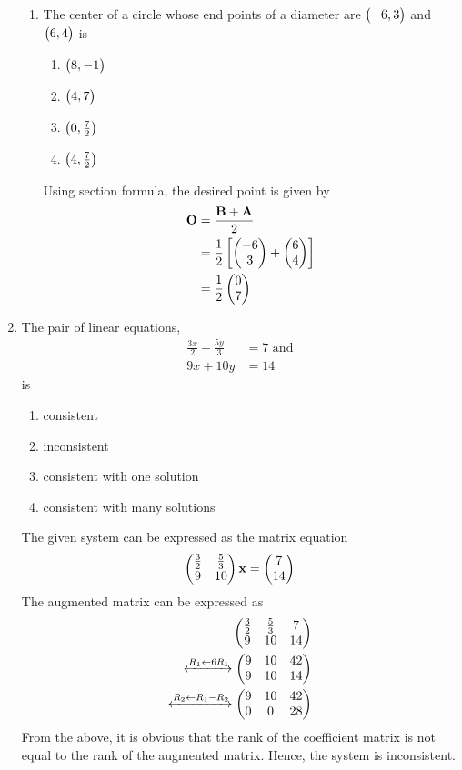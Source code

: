 \documentclass[journal,12pt,twocolumn]{IEEEtran}
\begin{document}
\begin{enumerate}
\begin{enumerate}
\item The center of a circle whose end points of a diameter are $\begin{pmatrix}-6, 3\end{pmatrix}$ and $\begin{pmatrix}6,4\end{pmatrix}$ is
\begin{enumerate}
\item $\begin{pmatrix}8,-1\end{pmatrix}$
\item $\begin{pmatrix}4,7\end{pmatrix}$
\item $\begin{pmatrix}0,\frac{7}{2}\end{pmatrix}$
\item $\begin{pmatrix}4,\frac{7}{2}\end{pmatrix}$
\end{enumerate}
		\solution 
Using section formula, 
		the desired point is given by 
  \begin{align}
	  \mathbf{O}&= \frac{\mathbf{B}+ \mathbf{A}}{2}
	  \\
	  &= \frac{1}{2}{}\left[\begin{pmatrix} -6 \\ 3\end{pmatrix}+\begin{pmatrix}6 \\ 4\end{pmatrix}\right]
	  \\
	  &=\frac{1}{2}\begin{pmatrix}0 \\ 7\end{pmatrix}
  \end{align}
\end{enumerate}

\item The pair of linear equations,
	\begin{align}
		\frac{3x}{2} + \frac{5y}{3} &=7  \text{ and}\\
		9x + 10y &= 14
	\end{align}
		is
\begin{enumerate}
\item consistent
\item inconsistent 
\item consistent with one solution
\item consistent with many solutions
\end{enumerate}
\solution  The given system can be expressed as the matrix equation
	\begin{align}
		\begin{pmatrix}\frac{3}{2} & \frac{5}{3} 
		\\
9 & 10 
		\end{pmatrix}\mathbf{x}=\begin{pmatrix}7  \\14\end{pmatrix}
	\end{align}
	The augmented matrix can be expressed as 
	\begin{align}
		\begin{pmatrix}\frac{3}{2} & \frac{5}{3} & 7
		\\
		9 & 10 & 14
		\end{pmatrix}
		\\
		\xleftrightarrow[]{R_1 \leftarrow 6R_1}
		\begin{pmatrix}9 & 10 & 42
		\\
		9 & 10 &14
		\end{pmatrix}
		\\
		\xleftrightarrow[]{R_2 \leftarrow R_1 - R_2}
		\begin{pmatrix}9 & 10 & 42
		\\
		0 & 0 & 28
		\end{pmatrix}
	\end{align}
From the above, it is obvious that the rank of the coefficient matrix is not equal to the rank of the augmented matrix.  Hence, the system is inconsistent.	


\end{enumerate}
\end{document}
